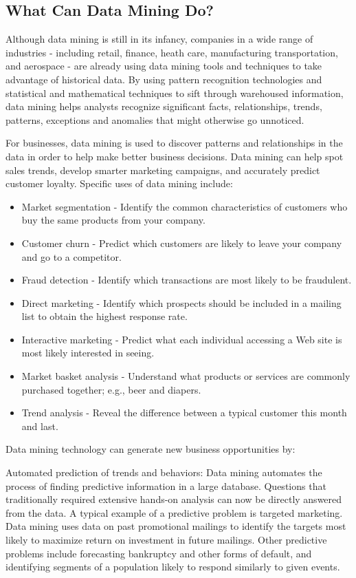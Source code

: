 \subsection{What Can Data Mining Do?}
Although data mining is still in its infancy, companies in a wide range of industries - including retail, finance, heath care, manufacturing transportation, and aerospace - are already using data mining tools and techniques to take advantage of historical data. By using pattern recognition technologies and statistical and mathematical techniques to sift through warehoused information, data mining helps analysts recognize significant facts, relationships, trends, patterns, exceptions and anomalies that might otherwise go unnoticed.

For businesses, data mining is used to discover patterns and relationships in the data in order to help make better business decisions. Data mining can help spot sales trends, develop smarter marketing campaigns, and accurately predict customer loyalty. Specific uses of data mining include:

\begin{itemize}
\item Market segmentation - Identify the common characteristics of customers who buy the same products from your company.
\item Customer churn - Predict which customers are likely to leave your company and go to a competitor.
\item Fraud detection - Identify which transactions are most likely to be fraudulent.
\item Direct marketing - Identify which prospects should be included in a mailing list to obtain the highest response rate.
\item Interactive marketing - Predict what each individual accessing a Web site is most likely interested in seeing.
\item Market basket analysis - Understand what products or services are commonly purchased together; e.g., beer and diapers.
\item Trend analysis - Reveal the difference between a typical customer this month and last.
\end{itemize}
Data mining technology can generate new business opportunities by:

Automated prediction of trends and behaviors: Data mining automates the process of finding predictive information in a large database. Questions that traditionally required extensive hands-on analysis can now be directly answered from the data. A typical example of a predictive problem is targeted marketing. Data mining uses data on past promotional mailings to identify the targets most likely to maximize return on investment in future mailings. Other predictive problems include forecasting bankruptcy and other forms of default, and identifying segments of a population likely to respond similarly to given events.

